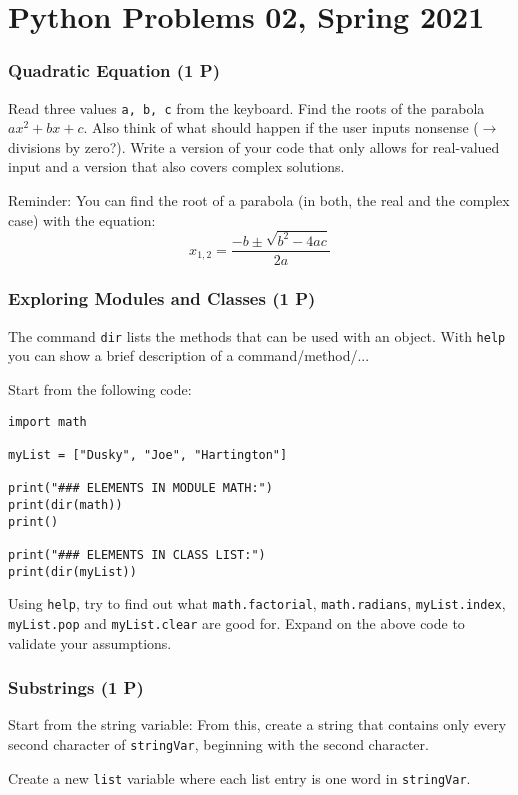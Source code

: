 \documentclass[
	ngerman,
	fontsize=10pt,
	parskip=half,
	titlepage=true,
	DIV=12
]{scrartcl}
\newcommand*{\inPy}[1]{\texttt{#1}}
\begin{document}
\part*{Python Problems 02, Spring 2021}
\section{Quadratic Equation (1 P)}
Read three values \inPy{a, b, c} from the keyboard. Find the roots of the parabola $ax^2 + bx +c$. Also think of what should happen if the user inputs nonsense ($\rightarrow$ divisions by zero?). Write a version of your code that only allows for real-valued input and a version that also covers complex solutions.

Reminder: You can find the root of a parabola (in both, the real and the complex case) with the equation:
\[ x_{1,2} = \frac{-b \pm \sqrt{b^2 - 4ac}}{2a} \]


\section{Exploring Modules and Classes (1 P)}
The command \inPy{dir} lists the methods that can be used with an object. With \inPy{help} you can show a brief description of a command/method/...

Start from the following code:
\begin{verbatim}
import math

myList = ["Dusky", "Joe", "Hartington"]

print("### ELEMENTS IN MODULE MATH:")
print(dir(math))
print()

print("### ELEMENTS IN CLASS LIST:")
print(dir(myList))
\end{verbatim}

Using \inPy{help}, try to find out what \inPy{math.factorial}, \inPy{math.radians}, \inPy{myList.index}, \inPy{myList.pop} and \inPy{myList.clear} are good for. Expand on the above code to validate your assumptions.


\section{Substrings (1 P)}
Start from the string variable:
From this, create a string that contains only every second character of \texttt{stringVar}, beginning with the second character.

Create a new \inPy{list} variable where each list entry is one word in \texttt{stringVar}.
\end{document}
